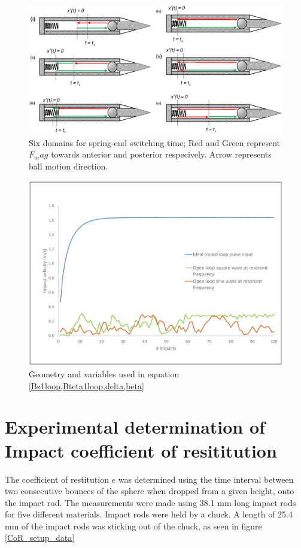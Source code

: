 \documentclass[letterpaper, 10 pt, conference]{ieeeconf}  %
\begin{document}
\begin{figure}
	\includegraphics[width=\linewidth]{Tswitch_cases_1to6.eps}
	\caption{Six domains for spring-end switching time; Red and Green represent $F_mag$ towards anterior and posterior respecively. Arrow represents ball motion direction.}
	\label{Tswitch}
\end{figure}


\begin{figure}
  \includegraphics[width=\linewidth]{close_vs_open_loop.eps}
  \caption{Geometry and variables used in equation \cref{Bz1loop,Bteta1loop,delta,beta}}
  \label{close_vs_open_loop}
\end{figure}


\section{Experimental determination of Impact coefficient of resititution}
\label{cor_det}
The coefficient of restitution $e$ was determined using the time interval between two consecutive bounces of the sphere when dropped from a given height, onto the impact rod. The measurements were made using 38.1 mm long impact rods for five different materials. Impact rods were held by a chuck. A length of 25.4 mm of the impact rods was sticking out of the chuck, as seen in figure \ref{CoR_setup_data}
\end{document}
